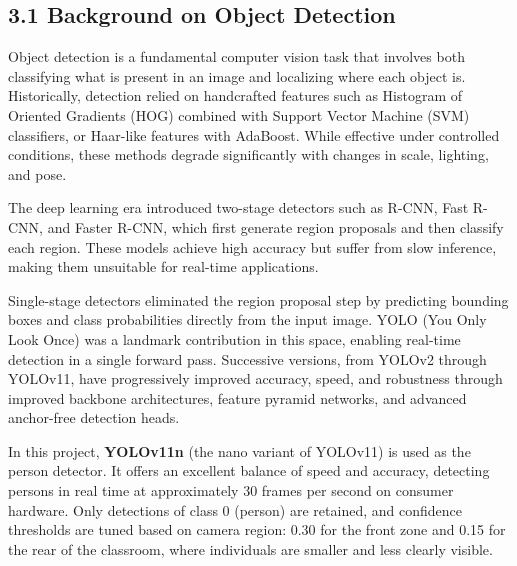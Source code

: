 \documentclass{report}
\begin{document}
\subsection*{3.1 Background on Object Detection}

Object detection is a fundamental computer vision task that involves both classifying what is present\vspace{3pt} in an image and localizing where each object is. Historically, detection relied on handcrafted features\vspace{3pt} such as Histogram of Oriented Gradients (HOG) combined with Support Vector Machine (SVM) classi\vspace{3pt}fiers, or Haar-like features with AdaBoost. While effective under controlled conditions, these methods\vspace{3pt} degrade significantly with changes in scale, lighting, and pose.

The deep learning era introduced two-stage detectors such as R-CNN, Fast R-CNN, and Faster R-CNN,\vspace{3pt} which first generate region proposals and then classify each region. These models achieve high accuracy\vspace{3pt} but suffer from slow inference, making them unsuitable for real-time applications.

Single-stage detectors eliminated the region proposal step by predicting bounding boxes and class\vspace{3pt} probabilities directly from the input image. YOLO (You Only Look Once) was a landmark contribution\vspace{3pt} in this space, enabling real-time detection in a single forward pass. Successive versions, from YOLOv2\vspace{3pt} through YOLOv11, have progressively improved accuracy, speed, and robustness through improved\vspace{3pt} backbone architectures, feature pyramid networks, and advanced anchor-free detection heads.

In this project, \textbf{YOLOv11n} (the nano variant of YOLOv11) is used as the person detector. It offers\vspace{3pt} an excellent balance of speed and accuracy, detecting persons in real time at approximately 30 frames\vspace{3pt} per second on consumer hardware. Only detections of class 0 (person) are retained, and confidence\vspace{3pt} thresholds are tuned based on camera region: 0.30 for the front zone and 0.15 for the rear of the\vspace{3pt} classroom, where individuals are smaller and less clearly visible.
\end{document}
